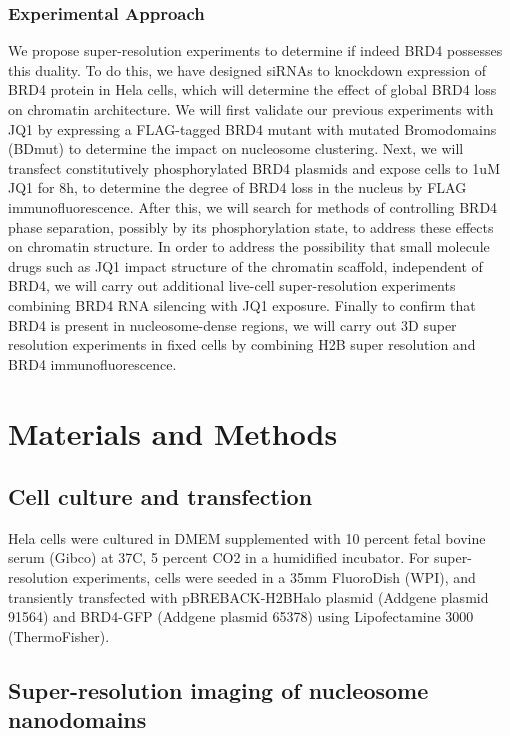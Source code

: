 \documentclass{ucetd}
\begin{document}
\subsubsection{Experimental Approach}

We propose super-resolution experiments to determine if indeed BRD4 possesses this duality. To do this, we have designed siRNAs to knockdown expression of BRD4 protein in Hela cells, which will determine the effect of global BRD4 loss on chromatin architecture. We will first validate our previous experiments with JQ1 by expressing a FLAG-tagged BRD4 mutant with mutated Bromodomains (BDmut) to determine the impact on nucleosome clustering. Next, we will transfect constitutively phosphorylated BRD4 plasmids and expose cells to 1uM JQ1 for 8h, to determine the degree of BRD4 loss in the nucleus by FLAG immunofluorescence. After this, we will search for methods of controlling BRD4 phase separation, possibly by its phosphorylation state, to address these effects on chromatin structure. In order to address the possibility that small molecule drugs such as JQ1 impact structure of the chromatin scaffold, independent of BRD4, we will carry out additional live-cell super-resolution experiments combining BRD4 RNA silencing with JQ1 exposure. Finally to confirm that BRD4 is present in nucleosome-dense regions, we will carry out 3D super resolution experiments in fixed cells by combining H2B super resolution and BRD4 immunofluorescence.


\section{Materials and Methods}

\subsection{Cell culture and transfection}

Hela cells were cultured in DMEM supplemented with 10 percent fetal bovine serum (Gibco) at 37C, 5 percent CO2 in a humidified incubator. For super-resolution experiments, cells were seeded in a 35mm FluoroDish (WPI), and transiently transfected with pBREBACK-H2BHalo plasmid (Addgene plasmid 91564) and BRD4-GFP (Addgene plasmid 65378) using Lipofectamine 3000 (ThermoFisher). 

\subsection{Super-resolution imaging of nucleosome nanodomains}
\end{document}
